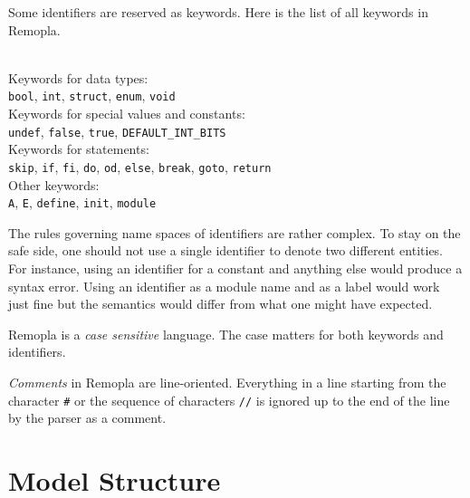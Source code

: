 \documentclass[a4paper,11pt,titlepage,english]{article}
\begin{document}
Some identifiers are reserved as keywords. Here is the list of all keywords
in Remopla.

\begin{tabbing}
\qquad \= \\\kill
Keywords for data types:\\
    \> \verb|bool|, \verb|int|, \verb|struct|, \verb|enum|, \verb|void|\\
Keywords for special values and constants:\\
    \> \verb|undef|, \verb|false|, \verb|true|, \verb|DEFAULT_INT_BITS|\\
Keywords for statements:\\
    \> \verb|skip|, \verb|if|, \verb|fi|, \verb|do|, \verb|od|, \verb|else|, \verb|break|, \verb|goto|, \verb|return|\\
Other keywords:\\
    \> \verb|A|, \verb|E|, \verb|define|, \verb|init|, \verb|module|\\
\end{tabbing}

The rules governing name spaces of identifiers are rather complex. To stay
on the safe side, one should not use a single identifier to denote two
different entities. For instance, using an identifier for a constant and
anything else would produce a syntax error. Using an identifier as a module
name and as a label would work just fine but the semantics would differ
from what one might have expected.

Remopla is a \emph{case sensitive} language. The case matters for both
keywords and identifiers.

\emph{Comments\/} in Remopla are line-oriented. Everything in a line
starting from the character \verb|#| or the sequence of characters
\verb|//| is ignored up to the end of the line by the parser as a comment.


\section{Model Structure\label{s:model}}
\end{document}
